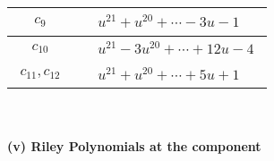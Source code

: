 \documentclass[1p]{elsarticle_modified}
\theoremstyle{definition}
\begin{document}
\begin{tabular}{m{50pt}|m{274pt}}
\hline $$\begin{aligned}c_{9}\end{aligned}$$&$\begin{aligned}
&u^{21}+u^{20}+\cdots-3 u-1
\end{aligned}$\\
\hline $$\begin{aligned}c_{10}\end{aligned}$$&$\begin{aligned}
&u^{21}-3 u^{20}+\cdots+12 u-4
\end{aligned}$\\
\hline $$\begin{aligned}c_{11},c_{12}\end{aligned}$$&$\begin{aligned}
&u^{21}+u^{20}+\cdots+5 u+1
\end{aligned}$\\
\hline
\end{tabular}\\~\\
\newpage\renewcommand{\arraystretch}{1}
\flushleft \textbf{(v) Riley Polynomials at the component}\newline \\
\end{document}
